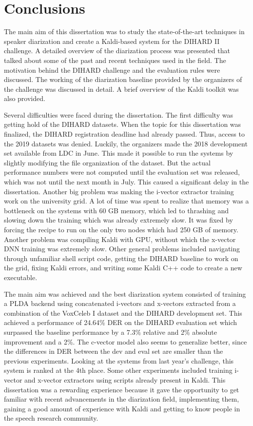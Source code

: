 \chapter{Conclusions}
The main aim of this dissertation was to study the state-of-the-art techniques in speaker diarization and create a Kaldi-based system for the DIHARD II challenge. A detailed overview of the diarization process was presented that talked about some of the past and recent techniques used in the field. The motivation behind the DIHARD challenge and the evaluation rules were discussed. The working of the diarization baseline provided by the organizers of the challenge was discussed in detail. A brief overview of the Kaldi toolkit was also provided.

Several difficulties were faced during the dissertation. The first difficulty was getting hold of the DIHARD datasets. When the topic for this dissertation was finalized, the DIHARD registration deadline had already passed. Thus, access to the 2019 datasets was denied. Luckily, the organizers made the 2018 development set available from LDC in June. This made it possible to run the systems by slightly modifying the file organization of the dataset. But the actual performance numbers were not computed until the evaluation set was released, which was not until the next month in July. This caused a significant delay in the dissertation. Another big problem was making the i-vector extractor training work on the university grid. A lot of time was spent to realize that memory was a bottleneck on the systems with 60 GB memory, which led to thrashing and slowing down the training which was already extremely slow. It was fixed by forcing the recipe to run on the only two nodes which had 250 GB of memory. Another problem was compiling Kaldi with GPU, without which the x-vector DNN training was extremely slow. Other general problems included navigating through unfamiliar shell script code, getting the DIHARD baseline to work on the grid, fixing Kaldi errors, and writing some Kaldi C++ code to create a new executable.

The main aim was achieved and the best diarization system consisted of training a PLDA backend using concatenated i-vectors and x-vectors extracted from a combination of the VoxCeleb I dataset and the DIHARD development set. This achieved a performance of 24.64\% DER on the DIHARD evaluation set which  surpassed the baseline performance by a 7.3\% relative and 2\% absolute improvement and a 2\%. The c-vector model also seems to generalize better, since the differences in DER between the dev and eval set are smaller than the previous experiments. Looking at the systems from last year's challenge, this system is ranked at the 4th place. Some other experiments included training i-vector and x-vector extractors using scripts already present in Kaldi. This dissertation was a rewarding experience because it gave the opportunity to get familiar with recent advancements in the diarization field, implementing them, gaining a good amount of experience with Kaldi and getting to know people in the speech research community.

